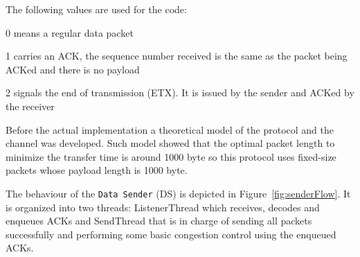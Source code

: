 \documentclass[10pt,twocolumn]{article}
\begin{document}
The following values are used for the code:
\begin{compactitem}
\item 0 means a regular data packet
\item 1 carries an ACK, the sequence number received is the same as the packet
	being ACKed and there is no payload
\item 2 signals the end of transmission (ETX). It is issued by the sender and
	ACKed by the receiver
\end{compactitem}

Before the actual implementation a theoretical model of the protocol and the
channel was developed. Such model showed that the optimal packet length to
minimize the transfer time is around 1000 byte so this protocol uses fixed-size
packets whose payload length is 1000 byte.

The behaviour of the \texttt{Data Sender} (DS) is depicted in Figure~\ref{fig:senderFlow}.
It is organized into two threads: ListenerThread which receives, decodes and
enqueues ACKs and SendThread that is in charge of sending all packets
successfully and performing some basic congestion control using the enqueued
ACKs.
\end{document}
